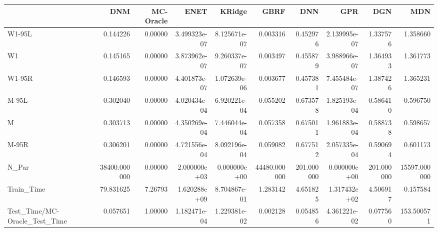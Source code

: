 \begin{tabular}{lrrrrrrrrr}
\toprule
{} &           DNM &  MC-Oracle &          ENET &        KRidge &          GBRF &         DNN &           GPR &         DGN &           MDN \\
\midrule
W1-95L                        &      0.144226 &    0.00000 &  3.499323e-07 &  8.125671e-07 &      0.003316 &    0.452976 &  2.139995e-07 &    1.337576 &      1.358660 \\
W1                            &      0.145165 &    0.00000 &  3.873962e-07 &  9.260337e-07 &      0.003497 &    0.455879 &  3.988966e-07 &    1.364933 &      1.361773 \\
W1-95R                        &      0.146593 &    0.00000 &  4.401873e-07 &  1.072639e-06 &      0.003677 &    0.457381 &  7.455484e-07 &    1.387426 &      1.365231 \\
M-95L                         &      0.302040 &    0.00000 &  4.020434e-04 &  6.920221e-04 &      0.055202 &    0.673578 &  1.825193e-04 &    0.586410 &      0.596750 \\
M                             &      0.303713 &    0.00000 &  4.350269e-04 &  7.446044e-04 &      0.057358 &    0.675011 &  1.961883e-04 &    0.588738 &      0.598657 \\
M-95R                         &      0.306201 &    0.00000 &  4.721556e-04 &  8.092196e-04 &      0.059082 &    0.677512 &  2.057335e-04 &    0.590694 &      0.601173 \\
N\_Par                         &  38400.000000 &    0.00000 &  2.000000e+03 &  0.000000e+00 &  44480.000000 &  201.000000 &  0.000000e+00 &  201.000000 &  15597.000000 \\
Train\_Time                    &     79.831625 &    7.26793 &  1.620288e+09 &  8.704867e-01 &      1.283142 &    4.651825 &  1.317432e+02 &    4.506917 &      0.157584 \\
Test\_Time/MC-Oracle\_Test\_Time &      0.057651 &    1.00000 &  1.182471e-04 &  1.229381e-02 &      0.002128 &    0.054856 &  4.361221e-02 &    0.077560 &    153.500571 \\
\bottomrule
\end{tabular}
